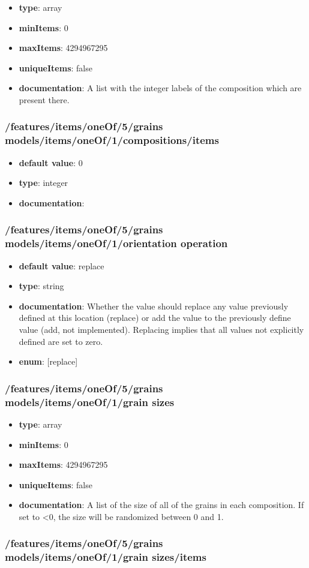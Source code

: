 \begin{itemize}\item {\bf type}: array
\item {\bf minItems}: 0
\item {\bf maxItems}: 4294967295
\item {\bf uniqueItems}: false
\item {\bf documentation}: A list with the integer labels of the composition which are present there.
\end{itemize}\subsubsection{/features/items/oneOf/5/grains models/items/oneOf/1/compositions/items}
\begin{itemize}\item {\bf default value}: 0
\item {\bf type}: integer
\item {\bf documentation}: 
\end{itemize}\subsubsection{/features/items/oneOf/5/grains models/items/oneOf/1/orientation operation}
\begin{itemize}\item {\bf default value}: replace
\item {\bf type}: string
\item {\bf documentation}: Whether the value should replace any value previously defined at this location (replace) or add the value to the previously define value (add, not implemented). Replacing implies that all values not explicitly defined are set to zero.
\item {\bf enum}: [replace]\end{itemize}\subsubsection{/features/items/oneOf/5/grains models/items/oneOf/1/grain sizes}
\begin{itemize}\item {\bf type}: array
\item {\bf minItems}: 0
\item {\bf maxItems}: 4294967295
\item {\bf uniqueItems}: false
\item {\bf documentation}: A list of the size of all of the grains in each composition. If set to <0, the size will be randomized between 0 and 1.
\end{itemize}\subsubsection{/features/items/oneOf/5/grains models/items/oneOf/1/grain sizes/items}

